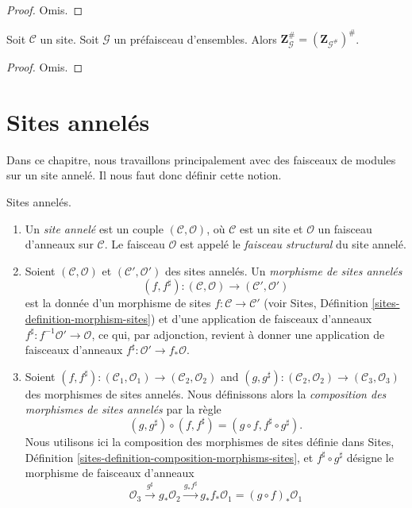 \begin{proof}
Omis.
\end{proof}

\begin{lemma}
\label{lemma-may-sheafify-before-abelianize}
Soit $\mathcal{C}$ un site. Soit $\mathcal{G}$ un préfaisceau d'ensembles.
Alors $\mathbf{Z}_\mathcal{G}^\# = (\mathbf{Z}_{\mathcal{G}^\#})^\#$.
\end{lemma}

\begin{proof}
Omis.
\end{proof}








\section{Sites annelés}
\label{section-ringed-sites}

\noindent
Dans ce chapitre, nous travaillons principalement avec des faisceaux de modules
sur un site annelé. Il nous faut donc définir cette notion.

\begin{definition}
\label{definition-ringed-site}
Sites annelés.
\begin{enumerate}
\item Un {\it site annelé} est un couple $(\mathcal{C}, \mathcal{O})$, où
$\mathcal{C}$ est un site et $\mathcal{O}$ un faisceau d'anneaux sur
$\mathcal{C}$. Le faisceau $\mathcal{O}$ est appelé le {\it faisceau
structural} du site annelé.
\item Soient $(\mathcal{C}, \mathcal{O})$ et
$(\mathcal{C}', \mathcal{O}')$ des sites annelés. Un {\it morphisme de sites
annelés}
$$
(f, f^\sharp) :
(\mathcal{C}, \mathcal{O})
\longrightarrow
(\mathcal{C}', \mathcal{O}')
$$
est la donnée d'un morphisme de sites $f : \mathcal{C} \to \mathcal{C}'$ (voir
Sites, Définition \ref{sites-definition-morphism-sites}) et d'une application
de faisceaux d'anneaux $f^\sharp : f^{-1}\mathcal{O}' \to \mathcal{O}$, ce qui,
par adjonction, revient à donner une application de faisceaux d'anneaux
$f^\sharp : \mathcal{O}' \to f_*\mathcal{O}$.
\item Soient
$(f, f^\sharp) :
(\mathcal{C}_1, \mathcal{O}_1) \to (\mathcal{C}_2, \mathcal{O}_2)$ and
$(g, g^\sharp) :
(\mathcal{C}_2, \mathcal{O}_2) \to (\mathcal{C}_3, \mathcal{O}_3)$
des morphismes de sites annelés. Nous définissons alors la {\it composition des
morphismes de sites annelés} par la règle
$$
(g, g^\sharp) \circ (f, f^\sharp) = (g \circ f, f^\sharp \circ g^\sharp).
$$
Nous utilisons ici la composition des morphismes de sites définie dans Sites,
Définition \ref{sites-definition-composition-morphisms-sites}, et
$f^\sharp \circ g^\sharp$ désigne le morphisme de faisceaux d'anneaux
$$
\mathcal{O}_3 \xrightarrow{g^\sharp} g_*\mathcal{O}_2
\xrightarrow{g_*f^\sharp} g_*f_*\mathcal{O}_1 = (g \circ f)_*\mathcal{O}_1
$$
\end{enumerate}
\end{definition}







